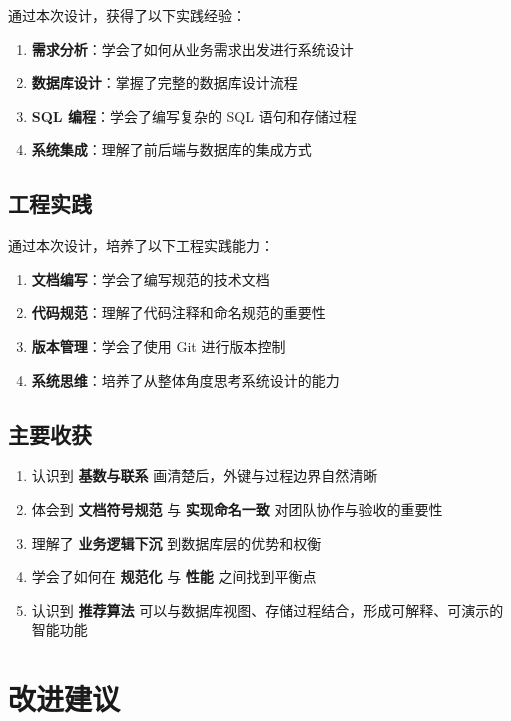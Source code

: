 通过本次设计，获得了以下实践经验：

\begin{enumerate}
  \item \textbf{需求分析}：学会了如何从业务需求出发进行系统设计
  \item \textbf{数据库设计}：掌握了完整的数据库设计流程
  \item \textbf{SQL 编程}：学会了编写复杂的 SQL 语句和存储过程
  \item \textbf{系统集成}：理解了前后端与数据库的集成方式
\end{enumerate}

\subsection{工程实践}

通过本次设计，培养了以下工程实践能力：

\begin{enumerate}
  \item \textbf{文档编写}：学会了编写规范的技术文档
  \item \textbf{代码规范}：理解了代码注释和命名规范的重要性
  \item \textbf{版本管理}：学会了使用 Git 进行版本控制
  \item \textbf{系统思维}：培养了从整体角度思考系统设计的能力
\end{enumerate}

\subsection{主要收获}

\begin{enumerate}
  \item 认识到 \textbf{基数与联系} 画清楚后，外键与过程边界自然清晰
  \item 体会到 \textbf{文档符号规范} 与 \textbf{实现命名一致} 对团队协作与验收的重要性
  \item 理解了 \textbf{业务逻辑下沉} 到数据库层的优势和权衡
  \item 学会了如何在 \textbf{规范化} 与 \textbf{性能} 之间找到平衡点
  \item 认识到 \textbf{推荐算法} 可以与数据库视图、存储过程结合，形成可解释、可演示的智能功能
\end{enumerate}

\section{改进建议}

